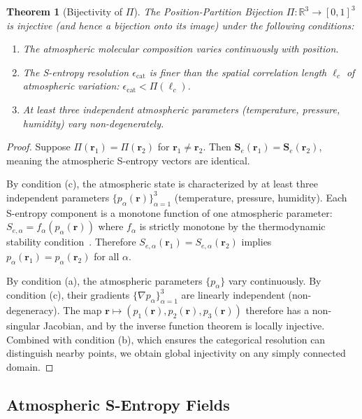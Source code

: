 \documentclass[twocolumn,10pt]{article}
\newtheorem{theorem}{Theorem}[section]
\theoremstyle{definition}
\theoremstyle{remark}
\newcommand{\Sent}{\mathbf{S}}
\newcommand{\R}{\mathbb{R}}
\begin{document}
\begin{theorem}[Bijectivity of $\Pi$]\label{thm:pi-bijection}
The Position-Partition Bijection $\Pi: \R^3 \to [0,1]^3$ is injective
(and hence a bijection onto its image) under the following conditions:
\begin{enumerate}[label=(\alph*)]
  \item The atmospheric molecular composition varies continuously with
    position.
  \item The S-entropy resolution $\epsilon_{\mathrm{cat}}$ is finer than
    the spatial correlation length $\ell_c$ of atmospheric variation:
    $\epsilon_{\mathrm{cat}} < \Pi(\ell_c)$.
  \item At least three independent atmospheric parameters (temperature,
    pressure, humidity) vary non-degenerately.
\end{enumerate}
\end{theorem}

\begin{proof}
Suppose $\Pi(\mathbf{r}_1) = \Pi(\mathbf{r}_2)$ for
$\mathbf{r}_1 \neq \mathbf{r}_2$. Then
$\Sent_e(\mathbf{r}_1) = \Sent_e(\mathbf{r}_2)$, meaning the
atmospheric S-entropy vectors are identical.

By condition (c), the atmospheric state is characterized by at least three
independent parameters $\{p_\alpha(\mathbf{r})\}_{\alpha=1}^{3}$
(temperature, pressure, humidity). Each S-entropy component is a monotone
function of one atmospheric parameter:
$S_{e,\alpha} = f_\alpha(p_\alpha(\mathbf{r}))$ where $f_\alpha$ is
strictly monotone by the thermodynamic stability
condition~\cite{jaynes1957}. Therefore
$S_{e,\alpha}(\mathbf{r}_1) = S_{e,\alpha}(\mathbf{r}_2)$ implies
$p_\alpha(\mathbf{r}_1) = p_\alpha(\mathbf{r}_2)$ for all $\alpha$.

By condition (a), the atmospheric parameters $\{p_\alpha\}$ vary
continuously. By condition (c), their gradients
$\{\nabla p_\alpha\}_{\alpha=1}^3$ are linearly independent (non-degeneracy).
The map $\mathbf{r} \mapsto (p_1(\mathbf{r}), p_2(\mathbf{r}),
p_3(\mathbf{r}))$ therefore has a non-singular Jacobian, and by the
inverse function theorem is locally injective. Combined with condition (b),
which ensures the categorical resolution can distinguish nearby points,
we obtain global injectivity on any simply connected domain.
\end{proof}

\subsection{Atmospheric S-Entropy Fields}
\end{document}
